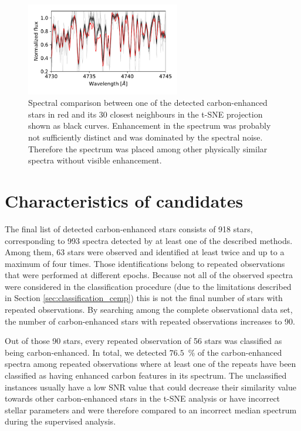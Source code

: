 \begin{figure}
	\centering
	\includegraphics[width=0.6\textwidth]{150206004301057_tsne_close30.pdf}
	\caption{Spectral comparison between one of the detected carbon-enhanced stars in red and its 30 closest neighbours in the t-SNE projection shown as black curves. Enhancement in the spectrum was probably not sufficiently distinct and was dominated by the spectral noise. Therefore the spectrum was placed among other physically similar spectra without visible enhancement.}
	\label{fig:tsne_30close}
\end{figure}

\section{Characteristics of candidates}
\label{sec:analysis_cemp}
The final list of detected carbon-enhanced stars consists of 918 stars, corresponding to 993 spectra detected by at least one of the described methods. Among them, 63 stars were observed and identified at least twice and up to a maximum of four times. Those identifications belong to repeated observations that were performed at different epochs. Because not all of the observed spectra were considered in the classification procedure (due to the limitations described in Section \ref{sec:classification_cemp}) this is not the final number of stars with repeated observations. By searching among the complete observational data set, the number of carbon-enhanced stars with repeated observations increases to 90.

Out of those 90 stars, every repeated observation of 56 stars was classified as being carbon-enhanced. In total, we detected $76.5$~\% of the carbon-enhanced spectra among repeated observations where at least one of the repeats have been classified as having enhanced carbon features in its spectrum. The unclassified instances usually have a low SNR value that could decrease their similarity value towards other carbon-enhanced stars in the t-SNE analysis or have incorrect stellar parameters and were therefore compared to an incorrect median spectrum during the supervised analysis.

